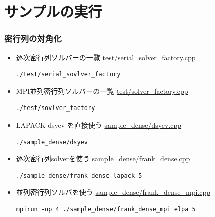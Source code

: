 \section{サンプルの実行}

\begin{frame}[c,fragile]
  \frametitle{密行列の対角化}
  \begin{itemize}
  \item 逐次密行列ソルバーの一覧 \href{https://github.com/t-sakashita/rokko/blob/master/test/serial_solver_factory.cpp}{test/serial\_solver\_factory.cpp}
\begin{lstlisting}
./test/serial_sovlver_factory
\end{lstlisting}
  \item MPI並列密行列ソルバーの一覧 \href{https://github.com/t-sakashita/rokko/blob/master/test/solver_factory.cpp}{test/solver\_factory.cpp}
\begin{lstlisting}
./test/sovlver_factory
\end{lstlisting}
  \item LAPACK dsyev を直接使う \href{https://github.com/t-sakashita/rokko/blob/master/sample_dense/dsyev.c}{sample\_dense/dsyev.cpp}
\begin{lstlisting}
./sample_dense/dsyev
\end{lstlisting}
  \item 逐次密行列solverを使う \href{https://github.com/t-sakashita/rokko/blob/master/sample_dense/frank_dense.cpp}{sample\_dense/frank\_dense.cpp}
\begin{lstlisting}
./sample_dense/frank_dense lapack 5
\end{lstlisting}
  \item 並列密行列ソルバを使う \href{https://github.com/t-sakashita/rokko/blob/master/sample_dense/frank_dense_mpi.cpp}{sample\_dense/frank\_dense\_mpi.cpp}
\begin{lstlisting}
mpirun -np 4 ./sample_dense/frank_dense_mpi elpa 5
\end{lstlisting}
  \end{itemize}
\end{frame}

